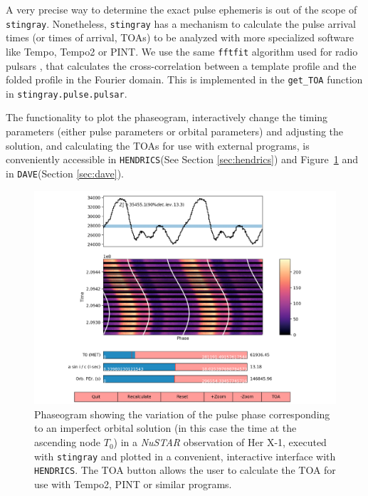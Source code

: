 \documentclass[twocolumn]{aastex62}
\newcommand{\project}[1]{\textsl{#1}\xspace}
\newcommand{\nustar}{\project{NuSTAR}\xspace}
\newcommand{\stingray}{\texttt{stingray}\xspace}
\newcommand{\hendrics}{\texttt{HENDRICS}\xspace}
\newcommand{\dave}{\texttt{DAVE}\xspace}
\begin{document}
A very precise way to determine the exact pulse ephemeris is out of the scope of \stingray. 
Nonetheless, \stingray has a mechanism to calculate the pulse arrival times (or times of arrival, TOAs) to be analyzed with more specialized software like Tempo, Tempo2 or PINT. 
We use the same \texttt{fftfit} algorithm used for radio pulsars \citep{Taylor92}, that calculates the cross-correlation between a template profile and the folded profile in the Fourier domain. 
This is implemented in the \texttt{get\_TOA} function in \texttt{stingray.pulse.pulsar}.

The functionality to plot the phaseogram, interactively change the timing parameters (either pulse parameters or orbital parameters) and adjusting the solution, and calculating the TOAs for use with external programs, is conveniently accessible in \hendrics (See Section \ref{sec:hendrics}) and Figure~\ref{fig:phaseogram} and in \dave (Section \ref{sec:dave}).

\begin{figure}[htbp]
\begin{center}
\includegraphics[width=\linewidth]{../figures/phaseogram.pdf}
\caption{Phaseogram showing the variation of the pulse phase corresponding to an imperfect orbital solution (in this case the time at the ascending node $T_0$) in a \nustar observation of Her X-1, executed with \stingray and plotted in a convenient, interactive interface with \hendrics. 
The TOA button allows the user to calculate the TOA for use with Tempo2, PINT or similar programs.}
\label{fig:phaseogram}
\end{center}
\end{figure}
\end{document}
